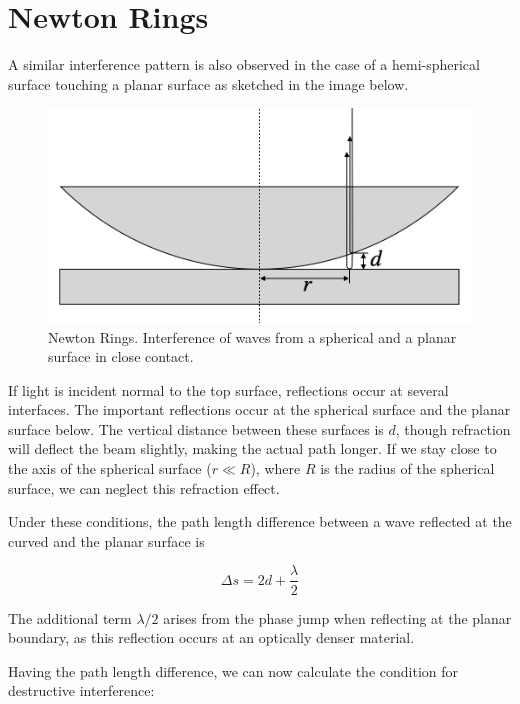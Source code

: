 \documentclass[
  a4paper,
]{book}
\begin{document}
\section{Newton Rings}\label{newton-rings}

A similar interference pattern is also observed in the case of a
hemi-spherical surface touching a planar surface as sketched in the
image below.

\begin{figure}[H]

{\centering \includegraphics[width=0.8\linewidth,height=\textheight,keepaspectratio]{wave-optics/img/newton_ring_sketch.png}

}

\caption{Newton Rings. Interference of waves from a spherical and a
planar surface in close contact.}

\end{figure}%

If light is incident normal to the top surface, reflections occur at
several interfaces. The important reflections occur at the spherical
surface and the planar surface below. The vertical distance between
these surfaces is \(d\), though refraction will deflect the beam
slightly, making the actual path longer. If we stay close to the axis of
the spherical surface (\(r\ll R\)), where \(R\) is the radius of the
spherical surface, we can neglect this refraction effect.

Under these conditions, the path length difference between a wave
reflected at the curved and the planar surface is

\[
\Delta s=2d+\frac{\lambda}{2}
\]

The additional term \(\lambda/2\) arises from the phase jump when
reflecting at the planar boundary, as this reflection occurs at an
optically denser material.

Having the path length difference, we can now calculate the condition
for destructive interference:
\end{document}
